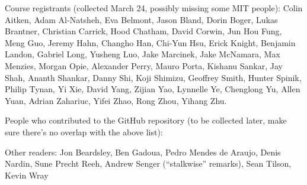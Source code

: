 Course registrants (collected March 24, possibly missing some MIT people): Colin Aitken, Adam Al-Natsheh, Eva Belmont, Jason Bland, Dorin Boger, Lukas Brantner, Christian Carrick, Hood Chatham, David Corwin, Jun Hou Fung, Meng Guo, Jeremy Hahn, Changho Han, Chi-Yun Hsu, Erick Knight, Benjamin Landon, Gabriel Long, Yusheng Luo, Jake Marcinek, Jake McNamara, Max Menzies, Morgan Opie, Alexander Perry, Mauro Porta, Kishanu Sankar, Jay Shah, Ananth Shankar, Danny Shi, Koji Shimizu, Geoffrey Smith, Hunter Spinik, Philip Tynan, Yi Xie, David Yang, Zijian Yao, Lynnelle Ye, Chenglong Yu, Allen Yuan, Adrian Zahariuc, Yifei Zhao, Rong Zhou, Yihang Zhu.

People who contributed to the GitHub repository (to be collected later, make sure there's no overlap with the above list): 

Other readers: Jon Beardsley, Ben Gadoua, Pedro Mendes de Araujo, Denis Nardin, Sune Precht Reeh, Andrew Senger (``stalkwise'' remarks), Sean Tilson, Kevin Wray

